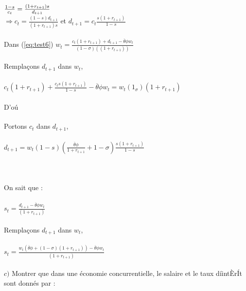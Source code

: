 \documentclass[11pt,twoside,a4paper]{article}
\begin{document}
$\\
\frac{1-s}{c_t} = \frac{(1+r_{t+1})s}{ d_{t+1}}\\
$\\
$ \Rightarrow c_t= \frac{(1-s)d_{t+1}}{(1+r_{t+1})s}$  \: et \: $ d_{t+1}=c_t \frac{ s{(1+r_{t+1})}}{1-s}$\\ \\
Dans (\ref{eq:test6})\: $ w_t = \frac{c_t(1+r_{t+1}) + d_{t+1}-\overline{\theta}\phi w_t}{(1-\sigma)((1+r_{t+1}))}$\\ \\
Rempla\c{c}ons $d_{t+1}$ dans $w_t$, \\ \\
$c_t(1+r_{t+1})+\frac{c_t s{(1+r_{t+1})}}{1-s}-\overline{\theta}\phi w_t= w_t(1_\sigma)(1+r_{t+1})$ \\ \\
D'o\'{u} \:
  \\ \\ 
 Portons $c_t$ dans $d_{t+1}$, \\ \\
 $ d_{t+1}= w_t(1-s)(\frac{\overline{\theta}\phi}{1+r_{t+1}} +1- \sigma )\frac{ s{(1+r_{t+1})}}{1-s}$ \\ \\
\\ \\
 On sait que :  \\ \\
 $s_t=\frac{d_{t+1}-\overline{\theta}\phi w_t}{(1+r_{t+1})}$\\ \\ 
 Rempla\c{c}ons $d_{t+1}$ dans $w_t$, \\ \\
  $s_t=\frac{ w_t\left(\overline{\theta}\phi +(1- \sigma)(1+r_{t+1}) \right)-\overline{\theta}\phi w_t}{(1+r_{t+1})}$\\ \\






$c)$ Montrer que dans une économie concurrentielle, le salaire et le taux díintÈrÍt sont donnés par :
\end{document}
